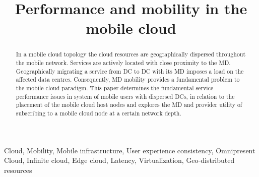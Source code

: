 \documentclass[conference]{IEEEtran}
\newcommand{\xcloud}{mobile cloud}
\newcommand{\dcs}{data centres}
\begin{document}
\title{Performance and mobility in the \xcloud}

\author{
\and
{}
}

\maketitle

\begin{abstract}
In a \xcloud{} topology the cloud resources are geographically dispersed throughout the mobile network. Services are actively located with close proximity to the \ac{MD}. Geographically migrating a service from \ac{DC} to \ac{DC} with its \ac{MD} imposes a load on the affected \dcs. Consequently, \ac{MD} mobility provides a fundamental problem to the \xcloud{} paradigm. This paper determines the fundamental service performance issues in system of mobile users with dispersed \ac{DC}s, in relation to the placement of the \xcloud{} host nodes and explores the \ac{MD} and provider utility of subscribing to a \xcloud{} node at a certain network depth.
\end{abstract}

\begin{keywords} 
Cloud, Mobility, Mobile infrastructure, User experience consistency, Omnipresent Cloud, Infinite cloud, Edge cloud, Latency, Virtualization, Geo-distributed resources
\end{keywords} 

\IEEEpeerreviewmaketitle






\end{document}

